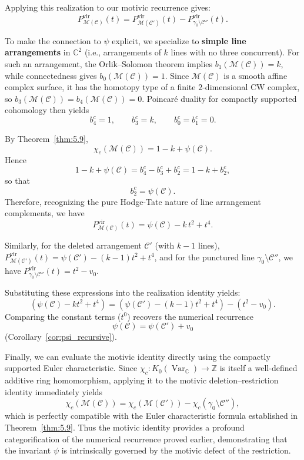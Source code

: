 \documentclass[article,11pt]{amsart} \numberwithin{equation}{section}
\numberwithin{equation}{section}
\begin{document}
{\begin{rk}
	Applying this realization to our motivic recurrence gives:
	\[
	P_{\mathcal{M}(\mathcal C)}^{\mathrm{vir}}(t)
	=
	P_{\mathcal{M}(\mathcal C')}^{\mathrm{vir}}(t)
	-
	P_{\gamma_0 \setminus \mathcal C''}^{\mathrm{vir}}(t).
	\]
	
	To make the connection to $\psi$ explicit, we specialize to
	\textbf{simple line arrangements} in $\mathbb{C}^2$ (i.e., arrangements
	of $k$ lines with no three concurrent). For such an arrangement,
	the Orlik–Solomon theorem implies
	$b_1(\mathcal{M}(\mathcal C)) = k$, while connectedness gives
	$b_0(\mathcal{M}(\mathcal C)) = 1$. Since $\mathcal{M}(\mathcal C)$ is a smooth affine
	complex surface, it has the homotopy type of a finite $2$-dimensional
	CW complex, so $b_3(\mathcal{M}(\mathcal C)) = b_4(\mathcal{M}(\mathcal C)) = 0$.
	Poincar\'e duality for compactly supported cohomology then yields
	\[
	b_4^c = 1,\qquad b_3^c = k,\qquad b_0^c = b_1^c = 0.
	\]
	
	By Theorem~\ref{thm:5.9},
	\[
	\chi_c(\mathcal{M}(\mathcal C)) = 1 - k + \psi(\mathcal C).
	\]
	Hence
	\[
	1 - k + \psi(\mathcal C)
	=
	b_4^c - b_3^c + b_2^c
	=
	1 - k + b_2^c,
	\]
	so that
	\[
	b_2^c = \psi(\mathcal C).
	\]
	Therefore, recognizing the pure Hodge-Tate nature of line arrangement complements, we have
	\[
	P_{\mathcal{M}(\mathcal C)}^{\mathrm{vir}}(t) = \psi(\mathcal C) - k\,t^2 + t^4.
	\]
	
	Similarly, for the deleted arrangement $\mathcal C'$ (with $k-1$ lines),
	$P_{\mathcal{M}(\mathcal C')}^{\mathrm{vir}}(t) = \psi(\mathcal C') - (k-1)t^2 + t^4$,
	and for the punctured line $\gamma_0 \setminus \mathcal C''$, we have
	$P_{\gamma_0 \setminus \mathcal C''}^{\mathrm{vir}}(t) = t^2 - v_0$.
	
	Substituting these expressions into the realization identity yields:
	\[
	(\psi(\mathcal C) - k t^2 + t^4)
	=
	(\psi(\mathcal C') - (k-1) t^2 + t^4) - (t^2 - v_0).
	\]
	Comparing the constant terms ($t^0$) recovers the numerical recurrence
	\[
	\psi(\mathcal C) = \psi(\mathcal C') + v_0
	\]
	(Corollary~\ref{cor:psi_recursive}).
	
	Finally, we can evaluate the motivic identity directly using the compactly supported
	Euler characteristic. Since $\chi_c: K_0(\operatorname{Var}_{\mathbb{C}}) \longrightarrow \mathbb{Z}$ is itself a well-defined additive ring homomorphism, applying it to the motivic deletion--restriction identity immediately yields
	\[
	\chi_c(\mathcal{M}(\mathcal C))
	=
	\chi_c(\mathcal{M}(\mathcal C'))
	-
	\chi_c(\gamma_0\setminus\mathcal C''),
	\]
	which is perfectly compatible with the Euler characteristic formula established
	in Theorem~\ref{thm:5.9}. Thus the motivic identity
	provides a profound categorification of the numerical recurrence proved
	earlier, demonstrating that the invariant $\psi$ is intrinsically governed by the motivic defect of the restriction.
\end{rk}



}
\end{document}
